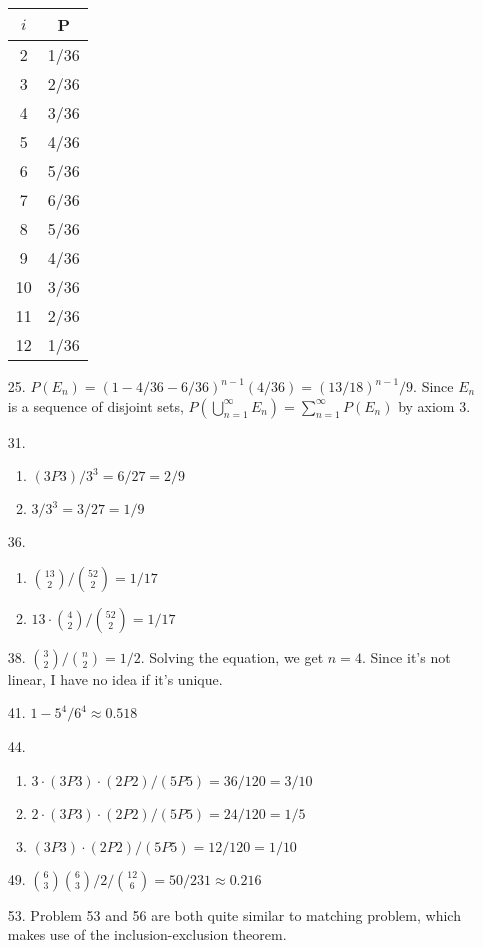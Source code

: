 \documentclass{article}
\begin{document}
\begin{itemize}
\begin{tabular}{c | c}
    $i$ & P \\
    \hline
    2 & 1/36 \\
    3 & 2/36 \\
    4 & 3/36 \\
    5 & 4/36 \\
    6 & 5/36 \\
    7 & 6/36 \\
    8 & 5/36 \\
    9 & 4/36 \\
    10 & 3/36 \\
    11 & 2/36 \\
    12 & 1/36
  \end{tabular}
\item [25.]
  $P(E_n)= (1-4/36-6/36)^{n-1}(4/36) = (13/18)^{n-1}/9$.
  Since $E_n$ is a sequence of disjoint sets,
  $P(\bigcup_{n=1}^{\infty}E_n)=\sum_{n=1}^{\infty}P(E_n)$ by axiom 3.
\item [31.]
  \begin{enumerate}[label=(\alph*)]
  \item $(3P3)/3^3=6/27=2/9$
  \item $3/3^3=3/27=1/9$
  \end{enumerate}
\item [36.]
  \begin{enumerate}[label=(\alph*)]
  \item ${13 \choose 2}/{52 \choose 2} = 1/17$
  \item $13 \cdot {4 \choose 2} / {52 \choose 2} = 1/17$
  \end{enumerate}
\item [38.]
  ${3 \choose 2}/{n \choose 2} = 1/2$. Solving the equation, we get
  $n=4$. Since it's not linear, I have no idea if it's unique.
\item [41.]
  $1-5^4/6^4\approx 0.518$
\item [44.]
  \begin{enumerate}[label=(\alph*)]
  \item $3\cdot(3P3)\cdot(2P2)/(5P5) = 36/120 = 3/10$
  \item $2\cdot(3P3)\cdot(2P2)/(5P5) = 24/120 = 1/5$
  \item $(3P3)\cdot(2P2)/(5P5) = 12/120=1/10$
  \end{enumerate}
\item [49.]
  ${6 \choose 3}{6 \choose 3}/2/{12 \choose 6} = 50/231 \approx 0.216$
\item [53.]
  Problem 53 and 56 are both quite similar to matching problem, which
  makes use of the inclusion-exclusion theorem.


\end{itemize}
\end{document}
